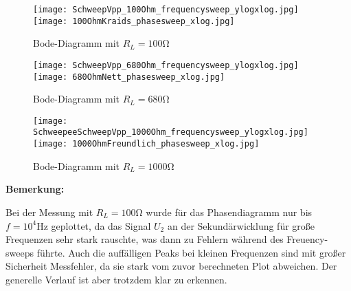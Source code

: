 \documentclass[10pt]{scrreprt}
\begin{document}
        \begin{center}
            \begin{figure}[H]
                \centering
                \texttt{[image: SchweepVpp\_100Ohm\_frequencysweep\_ylogxlog.jpg]}
                \texttt{[image: 100OhmKraids\_phasesweep\_xlog.jpg]}
                \caption{Bode-Diagramm mit $R_L = 100\si{\ohm}$}
            \end{figure}

            \begin{figure}[H]
                \centering
                \texttt{[image: SchweepVpp\_680Ohm\_frequencysweep\_ylogxlog.jpg]}
                \texttt{[image: 680OhmNett\_phasesweep\_xlog.jpg]}
                \caption{Bode-Diagramm mit $R_L = 680\si{\ohm}$}
            \end{figure}

            \begin{figure}[H]
                \centering
                \texttt{[image: SchweepeeSchweepVpp\_1000Ohm\_frequencysweep\_ylogxlog.jpg]}
                \texttt{[image: 1000OhmFreundlich\_phasesweep\_xlog.jpg]}
                \caption{Bode-Diagramm mit $R_L = 1000\si{\ohm}$}
            \end{figure}
        \end{center}

        \textbf{Bemerkung:}

        Bei der Messung mit $R_L = 100\si{\ohm}$ wurde für das Phasendiagramm nur
        bis $f = 10^4\si{\hertz}$ geplottet, da das Signal $U_2$ an der Sekundärwicklung
        für große Frequenzen sehr stark rauschte, was dann zu Fehlern während des
        Freuency-sweeps führte. Auch die auffälligen Peaks bei kleinen Frequenzen
        sind mit großer Sicherheit Messfehler, da sie stark vom zuvor berechneten
        Plot abweichen. Der generelle Verlauf ist aber trotzdem klar zu erkennen.
\end{document}
